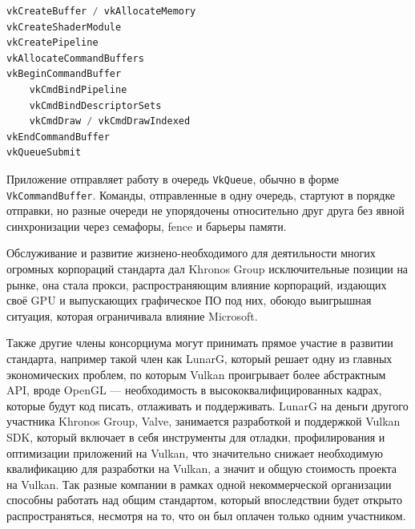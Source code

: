 \documentclass[12pt,a4paper]{article}
\begin{document}
\begin{lstlisting}[language=C++, title={\textbf{Пример инициализации рендера для Vulkan}}]
vkCreateBuffer / vkAllocateMemory
vkCreateShaderModule
vkCreatePipeline
vkAllocateCommandBuffers
vkBeginCommandBuffer
    vkCmdBindPipeline
    vkCmdBindDescriptorSets
    vkCmdDraw / vkCmdDrawIndexed
vkEndCommandBuffer
vkQueueSubmit
\end{lstlisting}

Приложение отправляет работу в очередь \texttt{VkQueue}, обычно в форме \texttt{VkCommandBuffer}.
Команды, отправленные в одну очередь, стартуют в порядке отправки, но разные очереди
не упорядочены относительно друг друга без явной синхронизации через семафоры, fence
и барьеры памяти.

\begin{center}
\end{center}

Обслуживание и развитие жизнено-необходимого для деятильности многих огромных корпораций 
стандарта дал Khronos Group исключительные позиции на рынке, она стала прокси, 
распространяющим влияние корпораций, издающих своё GPU и выпускающих графическое ПО под 
них, обоюдо выигрышная ситуация, которая ограничивала влияние Microsoft.

Также другие члены консорциума могут принимать прямое участие в развитии стандарта, например
такой член как LunarG, который решает одну из главных экономических проблем, по которым
Vulkan проигрывает более абстрактным API, вроде OpenGL --- необходимость в высококвалифицированных
кадрах, которые будут код писать, отлаживать и поддерживать. LunarG на деньги другого участника
Khronos Group, Valve, занимается разработкой и поддержкой Vulkan SDK, который включает в себя
инструменты для отладки, профилирования и оптимизации приложений на Vulkan, что значительно
снижает необходимую квалификацию для разработки на Vulkan, а значит и общую стоимость проекта
на Vulkan. Так разные компании в рамках одной некоммерческой организации способны работать над
общим стандартом, который впоследствии будет открыто распространяться, несмотря на то, что 
он был оплачен только одним участником.
\end{document}
